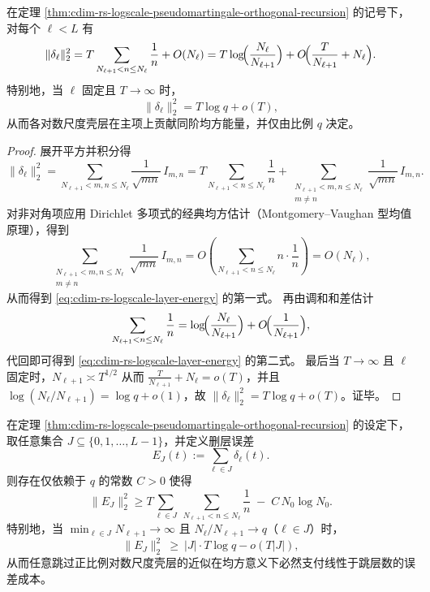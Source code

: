 \begin{corollary}[对数尺度层的均方能量等分律]\label{cor:cdim-rs-logscale-energy-equipartition}
在定理 \ref{thm:cdim-rs-logscale-pseudomartingale-orthogonal-recursion} 的记号下，对每个 \(\ell<L\) 有
\begin{equation}\label{eq:cdim-rs-logscale-layer-energy}
\|\delta_\ell\|_2^2
=T\sum_{N_{\ell+1}<n\le N_\ell}\frac1n+O(N_\ell)
=T\log\!\Bigl(\frac{N_\ell}{N_{\ell+1}}\Bigr)+O\!\Bigl(\frac{T}{N_{\ell+1}}+N_\ell\Bigr).
\end{equation}
特别地，当 \(\ell\) 固定且 \(T\to\infty\) 时，
\[
\|\delta_\ell\|_2^2=T\log q+o(T),
\]
从而各对数尺度壳层在主项上贡献同阶均方能量，并仅由比例 \(q\) 决定。
\end{corollary}

\begin{proof}
展开平方并积分得
\[
\|\delta_\ell\|_2^2
=\sum_{N_{\ell+1}<m,n\le N_\ell}\frac{1}{\sqrt{mn}}\,I_{m,n}
=T\sum_{N_{\ell+1}<n\le N_\ell}\frac1n+\sum_{\substack{N_{\ell+1}<m,n\le N_\ell\\ m\neq n}}\frac{1}{\sqrt{mn}}\,I_{m,n}.
\]
对非对角项应用 Dirichlet 多项式的经典均方估计（Montgomery--Vaughan 型均值原理），得到
\[
\sum_{\substack{N_{\ell+1}<m,n\le N_\ell\\ m\neq n}}\frac{1}{\sqrt{mn}}\,I_{m,n}
=O\!\left(\sum_{N_{\ell+1}<n\le N_\ell} n\cdot \frac{1}{n}\right)
=O(N_\ell),
\]
从而得到 \eqref{eq:cdim-rs-logscale-layer-energy} 的第一式。
再由调和和差估计
\[
\sum_{N_{\ell+1}<n\le N_\ell}\frac1n=\log\!\Bigl(\frac{N_\ell}{N_{\ell+1}}\Bigr)+O\!\Bigl(\frac{1}{N_{\ell+1}}\Bigr),
\]
代回即可得到 \eqref{eq:cdim-rs-logscale-layer-energy} 的第二式。
最后当 \(T\to\infty\) 且 \(\ell\) 固定时，\(N_{\ell+1}\asymp T^{1/2}\) 从而 \(\frac{T}{N_{\ell+1}}+N_\ell=o(T)\)，并且 \(\log(N_\ell/N_{\ell+1})=\log q+o(1)\)，故 \(\|\delta_\ell\|_2^2=T\log q+o(T)\)。证毕。
\end{proof}

\begin{theorem}\label{thm:cdim-rs-logscale-no-skipping-budget}
在定理 \ref{thm:cdim-rs-logscale-pseudomartingale-orthogonal-recursion} 的设定下，取任意集合 \(J\subseteq\{0,1,\dots,L-1\}\)，并定义删层误差
\[
E_J(t):=\sum_{\ell\in J}\delta_\ell(t).
\]
则存在仅依赖于 \(q\) 的常数 \(C>0\) 使得
\begin{equation}\label{eq:cdim-rs-logscale-no-skipping-budget}
\|E_J\|_2^2
\ge
T\sum_{\ell\in J}\ \sum_{N_{\ell+1}<n\le N_\ell}\frac1n
\;-\;C\,N_0\log N_0.
\end{equation}
特别地，当 \(\min_{\ell\in J}N_{\ell+1}\to\infty\) 且 \(N_\ell/N_{\ell+1}\to q\)（\(\ell\in J\)）时，
\[
\|E_J\|_2^2\ \ge\ |J|\cdot T\log q-o(T|J|),
\]
从而任意跳过正比例对数尺度壳层的近似在均方意义下必然支付线性于跳层数的误差成本。
\end{theorem}

